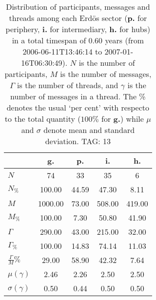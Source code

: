 \begin{table}[h!]
\begin{center}
\begin{tabular}{| l || c | c | c | c |}\hline
 & {\bf g.} & {\bf p.} & {\bf i.} & {\bf h.} \\\hline\hline
$N$ & 74  & 33  & 35  & 6 \\
$N_{\%}$ & 100.00  & 44.59  & 47.30  & 8.11 \\\hline
$M$ & 1000.00  & 73.00  & 508.00  & 419.00 \\
$M_{\%}$ & 100.00  & 7.30  & 50.80  & 41.90 \\\hline
$\Gamma$ & 290.00  & 43.00  & 215.00  & 32.00 \\
$\Gamma_{\%}$ & 100.00  & 14.83  & 74.14  & 11.03 \\\hline
$\frac{\Gamma}{M}\%$ & 29.00  & 58.90  & 42.32  & 7.64 \\
$\mu(\gamma)$ & 2.46  & 2.26  & 2.50  & 2.50 \\
$\sigma(\gamma)$ & 0.50  & 0.44  & 0.50  & 0.50 \\\hline
\end{tabular}
\caption{Distribution of participants, messages and threads among each Erd\"os sector ({\bf p.} for periphery, {\bf i.} for intermediary, 
    {\bf h.} for hubs) in a total timespan of 0.60 years (from 2006-06-11T13:46:14 to 2007-01-16T06:30:49). $N$ is the number of participants, $M$ is the number of messages, $\Gamma$ is the number of threads, and $\gamma$ is the number of messages in a thread.
    The \% denotes the usual `per cent' with respecto to the total quantity ($100\%$ for {\bf g.})
    while $\mu$ and $\sigma$ denote mean and standard deviation. TAG: 13}
\end{center}
\end{table}